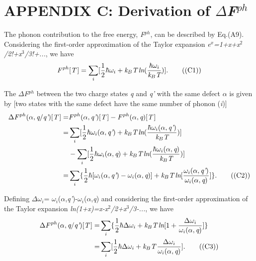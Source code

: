 \documentclass[onecolumn,preprint,superscriptaddress]{revtex4-1}
\begin{document}
\section*{APPENDIX C: Derivation of $\Delta$\emph{F}$^{ph}$}
The phonon contribution to the free energy, \emph{F}$^{ph}$, can be described by Eq.(A9). Considering the first-order approximation of the Taylor expansion \emph{e$^x$=1+x+x$^2$/2!+x$^3$/3!+...}, we have
\begin{equation}
\emph{F}^{\,ph}[\emph{T}\,]= \sum_{i}[\frac{1}{2}\hbar\omega_{i}+\emph{k}_{B}\emph{T}\,\emph{ln}(\frac{\hbar \omega _i}{\emph{k}_B\emph{T}})].   \tag{(C1)}
\end{equation}

The $\Delta$\emph{F}$^{ph}$ between the two charge states \emph{q} and \emph{q'} with the same defect $\alpha$ is given by [two states with the same defect have the same number of phonon (\emph{i})]
\begin{align}
\Delta\emph{F}^{\,ph}(\alpha,\emph{q}/\emph{q'})[\emph{T}\,]=&\emph{F}^{\,ph}(\alpha,\emph{q'})[\emph{T}\,]-
\emph{F}^{\,ph}(\alpha,\emph{q})[\emph{T}\,]\nonumber \\
=&\sum_{i}[\frac{1}{2}\hbar\omega_{i}(\alpha,\emph{q'})+\emph{k}_{B}\emph{T}\,\emph{ln}(\frac{\hbar \omega _i (\alpha,\emph{q'})}{\emph{k}_B\emph{T}})]\nonumber \\
&-\sum_{i}[\frac{1}{2}\hbar\omega_{i}(\alpha,\emph{q})+
\emph{k}_{B}\emph{T}\,\emph{ln}(\frac{\hbar \omega _i (\alpha,\emph{q})}{\emph{k}_B\emph{T}})]\nonumber \\
=&\sum_{i}\lbrace\frac{1}{2}\hbar[\omega_{i}(\alpha,\emph{q'})-\omega_{i}(\alpha,\emph{q})]+
\emph{k}_{B}\emph{T}\,\emph{ln}[\frac{\omega_i(\alpha,\emph{q'})}{\omega_i(\alpha,\emph{q})}]\rbrace. \tag{(C2)}
\end{align}

Defining $\Delta$$\omega$$_{i}$= $\omega$$_{i}$($\alpha$,\emph{q'})-$\omega$$_{i}$($\alpha$,\emph{q}) and considering the first-order approximation of the Taylor expansion \emph{ln(1+x)=x-x$^2$/2+x$^3$/3-...}, we have
\begin{align}
\Delta\emph{F}^{\,ph}(\alpha,\emph{q}/\emph{q'})[\emph{T}\,]=&\sum_{i}\lbrace\frac{1}{2}\hbar\Delta\omega_{i}+
\emph{k}_{B}\emph{T}\,\emph{ln}[1+\frac{\Delta \omega_i}{\omega_i(\alpha,\emph{q})}]\rbrace\nonumber \\
=&\sum_{i}[\frac{1}{2}\hbar\Delta\omega_{i}+\emph{k}_{B}\emph{T}\,\frac{\Delta \omega _i}{\omega_i(\alpha,\emph{q})}].   \tag{(C3)}
\end{align}
\end{document}
